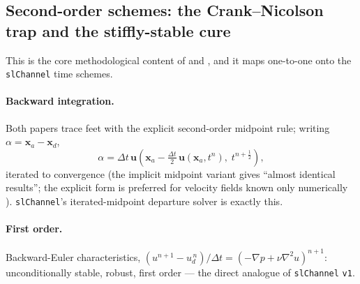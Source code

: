 \documentclass[11pt,a4paper]{article}
\newcommand{\bu}{\mathbf{u}}
\newcommand{\bx}{\mathbf{x}}
\begin{document}
\subsection{Second-order schemes: the Crank--Nicolson trap and the
stiffly-stable cure}

This is the core methodological content of \cite{xiu01} and
\cite{boukir97}, and it maps one-to-one onto the \texttt{slChannel} time
schemes.

\paragraph{Backward integration.} Both papers trace feet with the explicit
second-order midpoint rule; writing $\alpha=\bx_a-\bx_d$,
\begin{equation}
\alpha = \Delta t\,\bu\!\left(\bx_a - \tfrac{\Delta t}{2}\,
\bu(\bx_a,t^{n}),\; t^{n+\frac12}\right),
\label{eq:midpoint}
\end{equation}
iterated to convergence (the implicit midpoint variant gives ``almost
identical results''; the explicit form is preferred for velocity fields known
only numerically \cite{xiu01}). \texttt{slChannel}'s iterated-midpoint
departure solver is exactly this.

\paragraph{First order.} Backward-Euler characteristics,
$(u^{n+1}-u_d^{\,n})/\Delta t = (-\nabla p + \nu\nabla^2 u)^{n+1}$:
unconditionally stable, robust, first order --- the direct analogue of
\texttt{slChannel} \texttt{v1}.
\end{document}
